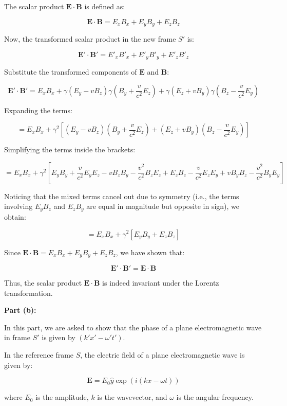 \documentclass{article}
\begin{document}
The scalar product \( \mathbf{E} \cdot \mathbf{B} \) is defined as:

\[
\mathbf{E} \cdot \mathbf{B} = E_x B_x + E_y B_y + E_z B_z
\]

Now, the transformed scalar product in the new frame \( S' \) is:

\[
\mathbf{E'} \cdot \mathbf{B'} = E'_x B'_x + E'_y B'_y + E'_z B'_z
\]

Substitute the transformed components of \( \mathbf{E} \) and \( \mathbf{B} \):

\[
\mathbf{E'} \cdot \mathbf{B'} = E_x B_x + \gamma (E_y - v B_z) \gamma \left( B_y + \frac{v}{c^2} E_z \right) + \gamma (E_z + v B_y) \gamma \left( B_z - \frac{v}{c^2} E_y \right)
\]

Expanding the terms:

\[
= E_x B_x + \gamma^2 \left[ (E_y - v B_z) (B_y + \frac{v}{c^2} E_z) + (E_z + v B_y) (B_z - \frac{v}{c^2} E_y) \right]
\]

Simplifying the terms inside the brackets:

\[
= E_x B_x + \gamma^2 \left[ E_y B_y + \frac{v}{c^2} E_y E_z - v B_z B_y - \frac{v^2}{c^2} B_z E_z + E_z B_z - \frac{v}{c^2} E_z E_y + v B_y B_z - \frac{v^2}{c^2} B_y E_y \right]
\]

Noticing that the mixed terms cancel out due to symmetry (i.e., the terms involving \( E_y B_z \) and \( E_z B_y \) are equal in magnitude but opposite in sign), we obtain:

\[
= E_x B_x + \gamma^2 \left[ E_y B_y + E_z B_z \right]
\]

Since \( \mathbf{E} \cdot \mathbf{B} = E_x B_x + E_y B_y + E_z B_z \), we have shown that:

\[
\mathbf{E'} \cdot \mathbf{B'} = \mathbf{E} \cdot \mathbf{B}
\]

Thus, the scalar product \( \mathbf{E} \cdot \mathbf{B} \) is indeed invariant under the Lorentz transformation.

\textbf{Part (b):}

In this part, we are asked to show that the phase of a plane electromagnetic wave in frame \( S' \) is given by \( (k' x' - \omega' t') \).

In the reference frame \( S \), the electric field of a plane electromagnetic wave is given by:

\[
\mathbf{E} = E_0 \hat{y} \exp \left( i (k x - \omega t) \right)
\]

where \( E_0 \) is the amplitude, \( k \) is the wavevector, and \( \omega \) is the angular frequency.
\end{document}
